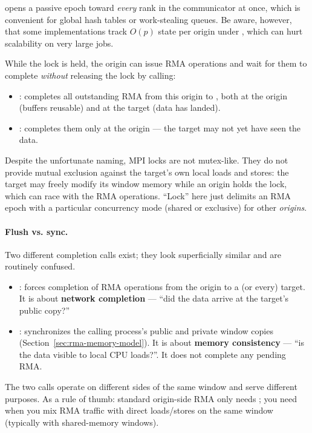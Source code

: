  opens a passive epoch toward \emph{every} rank in the communicator at once, which is convenient for global hash tables or work-stealing queues. Be aware, however, that some implementations track $O(p)$ state per origin under , which can hurt scalability on very large jobs.

While the lock is held, the origin can issue RMA operations and wait for them to complete \emph{without} releasing the lock by calling:
\begin{itemize}
    \item {}: completes all outstanding RMA from this origin to , both at the origin (buffers reusable) and at the target (data has landed).
    \item {}: completes them only at the origin --- the target may not yet have seen the data.
\end{itemize}

\begin{warningblock}
    Despite the unfortunate naming, MPI locks are not mutex-like. They do not provide mutual exclusion against the target's own local loads and stores: the target may freely modify its window memory while an origin holds the lock, which can race with the RMA operations. ``Lock'' here just delimits an RMA epoch with a particular concurrency mode (shared or exclusive) for other \emph{origins}.
\end{warningblock}

\paragraph{Flush vs. sync.} Two different completion calls exist; they look superficially similar and are routinely confused.

\begin{observationblock}
\begin{itemize}
    \item {}: forces completion of RMA operations from the origin to a (or every) target. It is about \textbf{network completion} --- ``did the data arrive at the target's public copy?''
    \item {}: synchronizes the calling process's public and private window copies (Section~\ref{sec:rma-memory-model}). It is about \textbf{memory consistency} --- ``is the data visible to local CPU loads?''. It does not complete any pending RMA.
\end{itemize}

The two calls operate on different sides of the same window and serve different purposes. As a rule of thumb: standard origin-side RMA only needs ; you need  when you mix RMA traffic with direct loads/stores on the same window (typically with shared-memory windows).
\end{observationblock}

